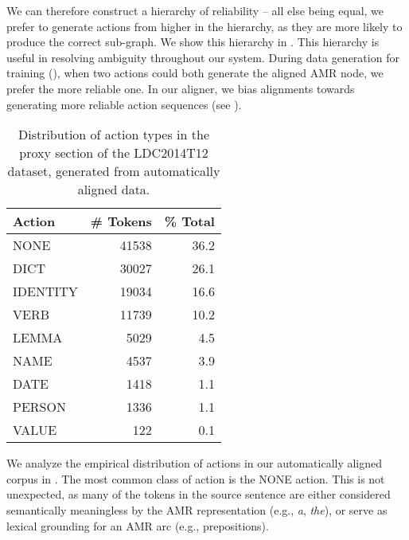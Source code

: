 \documentclass[11pt]{article}
\newcommand\w[1]{\textit{#1}} %
\begin{document}
We can therefore construct a hierarchy of reliability -- all else being equal, we
  prefer to generate actions from higher in the hierarchy, as they are more likely
  to produce the correct sub-graph.
We show this hierarchy in .
This hierarchy is useful in resolving ambiguity throughout our system. 
During data generation for training (), when two actions could both generate the aligned AMR node, we prefer the more reliable one.
In our aligner, we bias alignments towards generating more reliable action sequences (see ).



%
%

\begin{table}[h]
\begin{center}
\begin{tabular}{l|rr}
\bf Action & \bf \# Tokens & \bf \% Total \\ \hline
NONE & 41538 & 36.2 \\
DICT & 30027 & 26.1 \\
IDENTITY & 19034 & 16.6 \\
VERB & 11739 & 10.2 \\
LEMMA & 5029 & 4.5 \\
NAME & 4537 & 3.9 \\
DATE & 1418 & 1.1 \\
PERSON & 1336 & 1.1 \\
VALUE & 122  & 0.1\\
\end{tabular}
\end{center}
\caption{\label{tab:distro} Distribution of action types in the proxy section of the LDC2014T12 dataset, generated from automatically aligned data. }
\end{table}

We analyze the empirical distribution of actions in our automatically 
  aligned corpus in .
The most common class of action is the NONE action.
This is not unexpected, as many of the tokens in the source sentence are either
  considered semantically meaningless by the AMR representation (e.g.,
  \w{a}, \w{the}), or serve as lexical grounding for an AMR arc (e.g.,
  prepositions).
\end{document}
